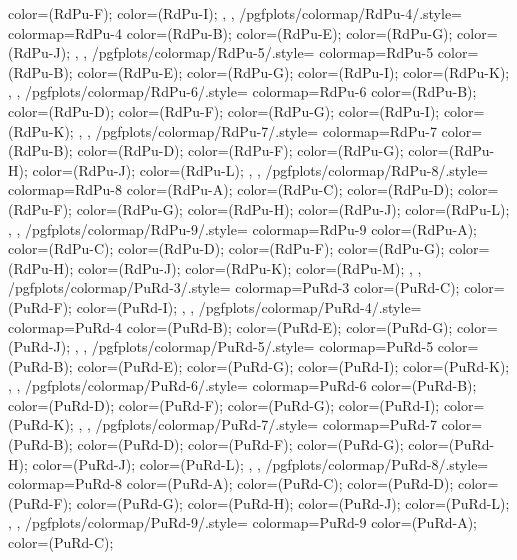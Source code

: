 {{{      color=(RdPu-F);
      color=(RdPu-I);
    },
  },
  /pgfplots/colormap/RdPu-4/.style={
    colormap={RdPu-4}{
      color=(RdPu-B);
      color=(RdPu-E);
      color=(RdPu-G);
      color=(RdPu-J);
    },
  },
  /pgfplots/colormap/RdPu-5/.style={
    colormap={RdPu-5}{
      color=(RdPu-B);
      color=(RdPu-E);
      color=(RdPu-G);
      color=(RdPu-I);
      color=(RdPu-K);
    },
  },
  /pgfplots/colormap/RdPu-6/.style={
    colormap={RdPu-6}{
      color=(RdPu-B);
      color=(RdPu-D);
      color=(RdPu-F);
      color=(RdPu-G);
      color=(RdPu-I);
      color=(RdPu-K);
    },
  },
  /pgfplots/colormap/RdPu-7/.style={
    colormap={RdPu-7}{
      color=(RdPu-B);
      color=(RdPu-D);
      color=(RdPu-F);
      color=(RdPu-G);
      color=(RdPu-H);
      color=(RdPu-J);
      color=(RdPu-L);
    },
  },
  /pgfplots/colormap/RdPu-8/.style={
    colormap={RdPu-8}{
      color=(RdPu-A);
      color=(RdPu-C);
      color=(RdPu-D);
      color=(RdPu-F);
      color=(RdPu-G);
      color=(RdPu-H);
      color=(RdPu-J);
      color=(RdPu-L);
    },
  },
  /pgfplots/colormap/RdPu-9/.style={
    colormap={RdPu-9}{
      color=(RdPu-A);
      color=(RdPu-C);
      color=(RdPu-D);
      color=(RdPu-F);
      color=(RdPu-G);
      color=(RdPu-H);
      color=(RdPu-J);
      color=(RdPu-K);
      color=(RdPu-M);
    },
  },
  /pgfplots/colormap/PuRd-3/.style={
    colormap={PuRd-3}{
      color=(PuRd-C);
      color=(PuRd-F);
      color=(PuRd-I);
    },
  },
  /pgfplots/colormap/PuRd-4/.style={
    colormap={PuRd-4}{
      color=(PuRd-B);
      color=(PuRd-E);
      color=(PuRd-G);
      color=(PuRd-J);
    },
  },
  /pgfplots/colormap/PuRd-5/.style={
    colormap={PuRd-5}{
      color=(PuRd-B);
      color=(PuRd-E);
      color=(PuRd-G);
      color=(PuRd-I);
      color=(PuRd-K);
    },
  },
  /pgfplots/colormap/PuRd-6/.style={
    colormap={PuRd-6}{
      color=(PuRd-B);
      color=(PuRd-D);
      color=(PuRd-F);
      color=(PuRd-G);
      color=(PuRd-I);
      color=(PuRd-K);
    },
  },
  /pgfplots/colormap/PuRd-7/.style={
    colormap={PuRd-7}{
      color=(PuRd-B);
      color=(PuRd-D);
      color=(PuRd-F);
      color=(PuRd-G);
      color=(PuRd-H);
      color=(PuRd-J);
      color=(PuRd-L);
    },
  },
  /pgfplots/colormap/PuRd-8/.style={
    colormap={PuRd-8}{
      color=(PuRd-A);
      color=(PuRd-C);
      color=(PuRd-D);
      color=(PuRd-F);
      color=(PuRd-G);
      color=(PuRd-H);
      color=(PuRd-J);
      color=(PuRd-L);
    },
  },
  /pgfplots/colormap/PuRd-9/.style={
    colormap={PuRd-9}{
      color=(PuRd-A);
      color=(PuRd-C);
}}}
